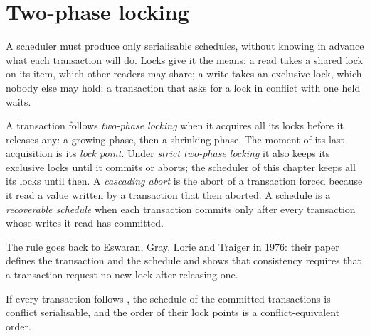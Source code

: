 \section{Two-phase locking}\label{sec:b3:transactions-and-recovery:2pl}

A scheduler must produce only serialisable schedules, without knowing in advance what each transaction will do. Locks give it the means: a read takes a shared lock on its item, which other readers may share; a write takes an exclusive lock, which nobody else may hold; a transaction that asks for a lock in conflict with one held waits.

\begin{definition}\label{def:b3:transactions-and-recovery:2pl}
A transaction follows \emph{two-phase locking} when it acquires all its locks before it releases any: a growing phase, then a shrinking phase. The moment of its last acquisition is its \emph{lock point}. Under \emph{strict two-phase locking} it also keeps its exclusive locks until it commits or aborts; the scheduler of this chapter keeps all its locks until then. A \emph{cascading abort} is the abort of a transaction forced because it read a value written by a transaction that then aborted. A schedule is a \emph{recoverable schedule} when each transaction commits only after every transaction whose writes it read has committed.
\end{definition}

The rule goes back to Eswaran, Gray, Lorie and Traiger in 1976: their paper defines the transaction and the schedule and shows that consistency requires that a transaction request no new lock after releasing one. %

\begin{theorem}\label{thm:b3:transactions-and-recovery:2pl}
If every transaction follows , the schedule of the committed transactions is conflict serialisable, and the order of their lock points is a conflict-equivalent  order.
\end{theorem}

